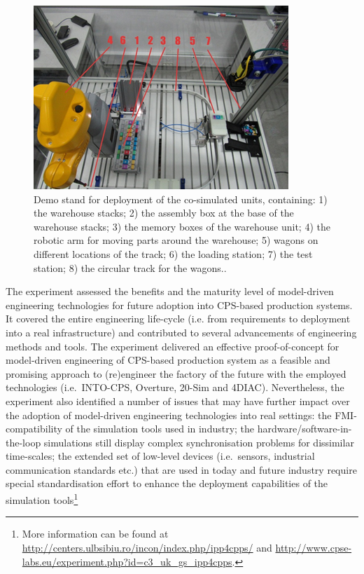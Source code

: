 \begin{figure}[!ht]
	\centering
		\includegraphics[width=0.9 \textwidth]{./figures/demo_stand}
	\caption{Demo stand for deployment of the co-simulated units, containing: 1) the warehouse stacks; 2) the assembly box at the base of the warehouse stacks; 3) the memory boxes of the warehouse unit; 4) the robotic arm for moving parts around the warehouse; 5) wagons on different locations of the track; 6) the loading station; 7) the test station; 8) the circular track for the wagons..}
	\label{fig:demo_stand}
\end{figure}

The experiment assessed the benefits and the maturity level of model-driven engineering technologies for future adoption into CPS-based production systems. It covered the entire engineering life-cycle (i.e. from requirements to deployment into a real infrastructure) and contributed to several advancements of engineering methods and tools. The experiment delivered an effective proof-of-concept for model-driven engineering of CPS-based production system as a feasible and promising approach to (re)engineer the factory of the future with the employed technologies (i.e.\ INTO-CPS, Overture, 20-Sim and 4DIAC). Nevertheless, the experiment also identified a number of issues that may have further impact over the adoption of model-driven engineering technologies into real settings: the FMI-compatibility of the simulation tools used in industry; the hardware/software-in-the-loop simulations still display complex synchronisation problems for dissimilar time-scales; the extended set of low-level devices (i.e.\ sensors, industrial communication standards etc.) that are used in today and future industry require special standardisation effort to enhance the deployment capabilities of the simulation tools\footnote{More information can be found at \url{http://centers.ulbsibiu.ro/incon/index.php/ipp4cpps/} and \url{http://www.cpse-labs.eu/experiment.php?id=c3_uk_gs_ipp4cpps}.}

